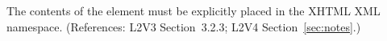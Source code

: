 The contents of the  element must be explicitly placed in the
XHTML XML namespace.  (References: L2V3 Section~3.2.3; L2V4 Section~\ref{sec:notes}.)
